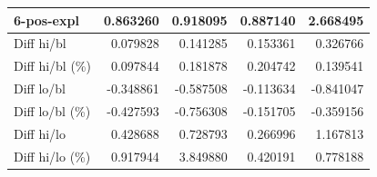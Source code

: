 \begin{table}
\begin{tabular}{lrrrr}
    6-pos-expl & 0.863260 & \bfseries 0.918095 & 0.887140 & \bfseries 2.668495 \\
    \midrule
    Diff hi/bl & 0.079828 & 0.141285 & 0.153361 & 0.326766 \\
    Diff hi/bl (\%) & 0.097844 & 0.181878 & 0.204742 & 0.139541 \\
    \midrule
    Diff lo/bl & -0.348861 & -0.587508 & -0.113634 & -0.841047 \\
    Diff lo/bl (\%) & -0.427593 & -0.756308 & -0.151705 & -0.359156 \\
    \midrule
    Diff hi/lo & 0.428688 & 0.728793 & 0.266996 & 1.167813 \\
    Diff hi/lo (\%) & 0.917944 & 3.849880 & 0.420191 & 0.778188 \\
    \bottomrule
    \end{tabular}

    \quad
    

\end{table}
